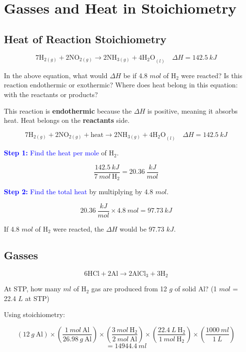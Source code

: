 \documentclass[a4paper, 12pt]{article}
\begin{document}
\section{Gasses and Heat in Stoichiometry}

\subsection{Heat of Reaction Stoichiometry}
$$7\text{H}_{2(g)} + 2\text{NO}_{2(g)} \longrightarrow 2\text{NH}_{3(g)} + 4\text{H$_2$O}_{(l)} \quad \Delta H = 142.5 \: kJ$$

In the above equation, what would $\Delta H$ be if 4.8 $mol$ of H$_2$ were reacted? Is this reaction endothermic or exothermic? Where does heat belong in this equation: with the reactants or products?

This reaction is \textbf{endothermic} because the $\Delta H$ is positive, meaning it absorbs heat. Heat belongs on the \textbf{reactants} side.

$$7\text{H}_{2(g)} + 2\text{NO}_{2(g)} + \text{heat} \longrightarrow 2\text{NH}_{3(g)} + 4\text{H$_2$O}_{(l)} \quad \Delta H = 142.5 \: kJ$$

\textcolor{blue}{\textbf{Step 1:} Find the heat per mole} of H$_2$.

$$\frac{142.5 \: kJ}{7 \: mol \: \text{H}_2} = 20.36 \: \frac{kJ}{mol}$$

\textcolor{blue}{\textbf{Step 2:} Find the total heat} by multiplying by 4.8 $mol$.

$$20.36 \: \frac{kJ}{mol} \times 4.8 \: mol = \boxed{97.73 \: kJ}$$

If 4.8 $mol$ of H$_2$ were reacted, the $\Delta H$ would be 97.73 $kJ$.

\subsection{Gasses}
$$6 \text{HCl} + 2 \text{Al} \longrightarrow 2 \text{AlCl}_3 + 3\text{H}_2$$

At STP, how many $ml$ of H$_2$ gas are produced from 12 $g$ of solid Al? (1 $mol$ = 22.4 $L$ at STP)

Using stoichiometry:

$$(12 \: g \: \text{Al}) \times \left(\frac{1 \: mol \: \text{Al}}{26.98 \: g \: \text{Al}}\right) \times \left(\frac{3 \: mol \: \text{H}_2}{2 \: mol \: \text{Al}}\right) \times \left(\frac{22.4 \: L \: \text{H}_2}{1 \: mol \: \text{H}_2}\right) \times \left(\frac{1000 \: ml}{1 \: L}\right)$$
$$ = \boxed{14944.4 \: ml}$$
\end{document}
